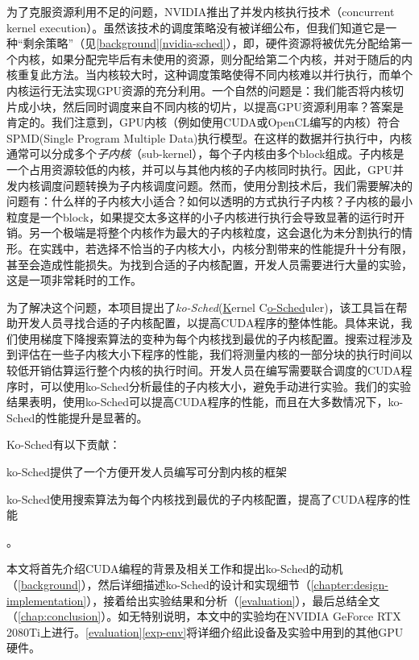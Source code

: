 为了克服资源利用不足的问题，NVIDIA推出了并发内核执行技术（concurrent kernel execution）\cite{concurrent-kernel-execution}。虽然该技术的调度策略没有被详细公布，但我们知道它是一种“剩余策略”（见\autoref{background}\autoref{nvidia-sched}），即，硬件资源将被优先分配给第一个内核，如果分配完毕后有未使用的资源，则分配给第二个内核，并对于随后的内核重复此方法。当内核较大时，这种调度策略使得不同内核难以并行执行，而单个内核运行无法实现GPU资源的充分利用。一个自然的问题是：我们能否将内核切片成小块，然后同时调度来自不同内核的切片，以提高GPU资源利用率？答案是肯定的。我们注意到，GPU内核（例如使用CUDA或OpenCL编写的内核）符合SPMD(Single Program Multiple Data)执行模型。在这样的数据并行执行中，内核通常可以分成多个\emph{子内核}（sub-kernel），每个子内核由多个block组成。子内核是一个占用资源较低的内核，并可以与其他内核的子内核同时执行。因此，GPU并发内核调度问题转换为子内核调度问题。然而，使用分割技术后，我们需要解决的问题有：什么样的子内核大小适合？如何以透明的方式执行子内核？子内核的最小粒度是一个block，如果提交太多这样的小子内核进行执行会导致显著的运行时开销。另一个极端是将整个内核作为最大的子内核粒度，这会退化为未分割执行的情形。在实践中，若选择不恰当的子内核大小，内核分割带来的性能提升十分有限，甚至会造成性能损失。为找到合适的子内核配置，开发人员需要进行大量的实验，这是一项非常耗时的工作。

为了解决这个问题，本项目提出了\emph{ko-Sched}(\underline{K}ernel C\underline{o-Sched}uler)，该工具旨在帮助开发人员寻找合适的子内核配置，以提高CUDA程序的整体性能。具体来说，我们使用梯度下降搜索算法的变种为每个内核找到最优的子内核配置。搜索过程涉及到评估在一些子内核大小下程序的性能，我们将测量内核的一部分块的执行时间以较低开销估算运行整个内核的执行时间。开发人员在编写需要联合调度的CUDA程序时，可以使用ko-Sched分析最佳的子内核大小，避免手动进行实验。我们的实验结果表明，使用ko-Sched可以提高CUDA程序的性能，而且在大多数情况下，ko-Sched的性能提升是显著的。


Ko-Sched有以下贡献：
\begin{enumerate*}[label=\roman*),itemjoin={\quad}]
    \item ko-Sched提供了一个方便开发人员编写可分割内核的框架
    \item ko-Sched使用搜索算法为每个内核找到最优的子内核配置，提高了CUDA程序的性能
\end{enumerate*}
。

本文将首先介绍CUDA编程的背景及相关工作和提出ko-Sched的动机（\autoref{background}），然后详细描述ko-Sched的设计和实现细节（\autoref{chapter:design-implementation}），接着给出实验结果和分析（\autoref{evaluation}），最后总结全文（\autoref{chap:conclusion}）。如无特别说明，本文中的实验均在NVIDIA GeForce RTX 2080Ti上进行。\autoref{evaluation}\autoref{exp-env}将详细介绍此设备及实验中用到的其他GPU硬件。
